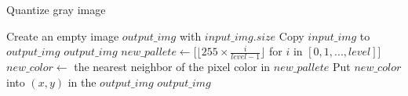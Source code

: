 \documentclass{article}
\begin{document}
\begin{algorithm}[h]
\centering
\caption{Quantize gray image}
\label{alg:quan}
  \begin{algorithmic}[1]
      \State Create an empty image $output\_img$ with $input\_img.size$
      	\State Copy $input\_img$ to $output\_img$
      	\State \Return $output\_img$
      \EndIf
      \State $new\_pallete \gets [\lfloor255 \times \frac{i}{level-1}\rfloor$ for $i$ in $[0, 1, ..., level]$]
      	\State $new\_color \gets$ the nearest neighbor of the pixel color in $new\_pallete$
      	\State Put $new\_color$ into $(x, y)$ in the $output\_img$
      \EndFor
      \State \Return $output\_img$
    \EndFunction
  \end{algorithmic}
\end{algorithm}
\end{document}
